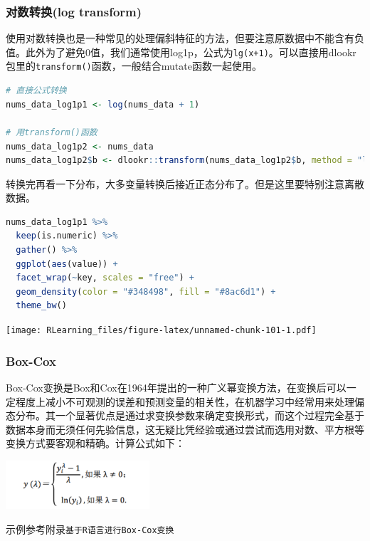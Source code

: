 \documentclass[]{ctexbook}
\newcommand{\passthrough}[1]{#1}
\begin{document}
\hypertarget{ux5bf9ux6570ux8f6cux6362log-transform}{%
\subsubsection{对数转换(log transform)}\label{ux5bf9ux6570ux8f6cux6362log-transform}}

使用对数转换也是一种常见的处理偏斜特征的方法，但要注意原数据中不能含有负值。此外为了避免0值，我们通常使用log1p，公式为\passthrough{\lstinline!lg(x+1)!}。可以直接用dlookr包里的\passthrough{\lstinline!transform()!}函数，一般结合mutate函数一起使用。

\begin{lstlisting}[language=R]
# 直接公式转换
nums_data_log1p1 <- log(nums_data + 1)

# 用transform()函数
nums_data_log1p2 <- nums_data
nums_data_log1p2$b <- dlookr::transform(nums_data_log1p2$b, method = "log+1")
\end{lstlisting}

转换完再看一下分布，大多变量转换后接近正态分布了。但是这里要特别注意离散数据。

\begin{lstlisting}[language=R]
nums_data_log1p1 %>%
  keep(is.numeric) %>%
  gather() %>%
  ggplot(aes(value)) +
  facet_wrap(~key, scales = "free") +
  geom_density(color = "#348498", fill = "#8ac6d1") +
  theme_bw()
\end{lstlisting}

\texttt{[image: RLearning\_files/figure-latex/unnamed-chunk-101-1.pdf]}

\hypertarget{box-cox}{%
\subsubsection{Box-Cox}\label{box-cox}}

Box-Cox变换是Box和Cox在1964年提出的一种广义幂变换方法，在变换后可以一定程度上减小不可观测的误差和预测变量的相关性，在机器学习中经常用来处理偏态分布。其一个显著优点是通过求变换参数来确定变换形式，而这个过程完全基于数据本身而无须任何先验信息，这无疑比凭经验或通过尝试而选用对数、平方根等变换方式要客观和精确。计算公式如下：

\includegraphics[width=0.4\textwidth,height=\textheight]{./image/task02_boxcox.png}

示例参考附录\passthrough{\lstinline!基于R语言进行Box-Cox变换!}
\end{document}
